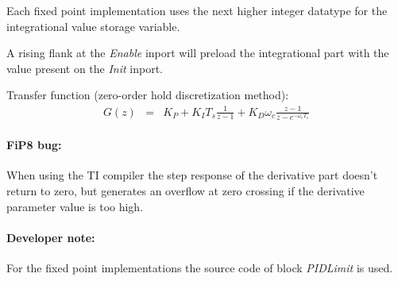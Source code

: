 Each fixed point implementation uses the next higher integer datatype for the integrational value storage variable.

A rising flank at the \textit{Enable} inport will preload the integrational part with the value present on the \textit{Init} inport.
\newline

\noindent
Transfer function (zero-order hold discretization method):
\begin{eqnarray*}
	G(z) &=& K_{P} + K_{I}T_{s}\frac{1}{z-1} + K_{D}\omega_{c}\frac{z-1}{z-e^{-\omega_{c}T_{s}}}
\end{eqnarray*}

\paragraph{FiP8 bug:} When using the TI compiler the step response of the derivative part doesn't return to zero, but generates an overflow at zero crossing if the derivative parameter value is too high.
\paragraph{Developer note:} For the fixed point implementations the source code of block \textit{PIDLimit} is used.
